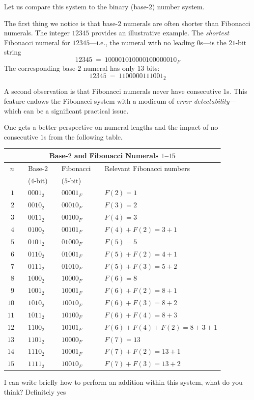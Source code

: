 \smallskip

Let us compare this system to the binary (base-$2$) number system.

The first thing we notice is that base-$2$ numerals are often shorter than Fibonacci numerals. The integer $12345$ provides an illustrative example.  The {\em shortest} Fibonacci numeral for $12345$---i.e., the numeral with no leading $0$s---is the $21$-bit string
\[ 12345 \ = \ 1 00001 01000 01000 00010_F \]
The corresponding base-$2$ numeral has only $13$ bits:
\[ 12345 \ = \ 110 00001 11001_2 \]

\medskip
A second observation is that Fibonacci numerals never have consecutive $1$s.  This feature endows the Fibonacci system with a modicum of {\em error detectability}---which can be a significant practical issue.

\medskip

One gets a better perspective on numeral lengths and the impact of no consecutive $1$s from the following table.

\smallskip

\begin{tabular}{|rclclcl|}
\multicolumn{7}{c}{\sf Base-$2$ and Fibonacci Numerals $1$--$15$} \\
\hline
$n$ & & Base-$2$  & & Fibonacci  & & Relevant Fibonacci numbers \\
       & & ($4$-bit)    & & ($5$-bit)   & & \\
\hline
\hline
$1$ & & $0001_2$ & & $00001_F$ & & $F(2) =1$ \\
\hline
$2$ & & $0010_2$ & & $00010_F$ & & $F(3) = 2$ \\
\hline
$3$ & & $0011_2$ & &  $00100_F$ & & $F(4) = 3$ \\
\hline
$4$ & & $0100_2$ & &  $00101_F$ & & $F(4) + F(2) = 3+1$ \\ 
\hline
$5$ & & $0101_2$ & &  $01000_F$ & & $F(5) = 5$ \\
\hline
$6$ & & $0110_2$ & &  $01001_F$ & & $F(5) + F(2) = 4+1$ \\
\hline 
$7$ & & $0111_2$ & &  $01010_F$ & &  $F(5) + F(3) = 5+2$ \\
\hline 
$8$ & & $1000_2$ & & $10000_F$ & &  $F(6) = 8$ \\ 
\hline
$9$ & & $1001_2$ & & $10001_F$ & &  $F(6) + F(2) = 8 +1$ \\ 
\hline
$10$ & & $1010_2$ & & $10010_F$ & &  $F(6) + F(3) = 8 +2$ \\ 
\hline
$11$ & & $1011_2$ & & $10100_F$ & &  $F(6) + F(4) = 8 +3$ \\ 
\hline
$12$ & & $1100_2$ & & $10101_F$ & &  $F(6) + F(4) + F(2) = 8 +3 +1$ \\ 
\hline
$13$ & & $1101_2$ & & $10000_F$ & &  $F(7) = 13$ \\ 
\hline
$14$ & & $1110_2$ & & $10001_F$ & &  $F(7)  + F(2) = 13 +1$ \\ 
\hline
$15$ & & $1111_2$ & & $10010_F$ & &  $F(7) + F(3) = 13 +2$ \\ 
\hline
\end{tabular}
 

\medskip

{\Denis I can write briefly how to perform an addition within this system, what do you think?}
{\Arny Definitely yes}

